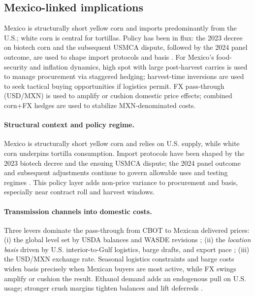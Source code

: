 \documentclass[10pt,a4paper]{article} %
\begin{document}
\subsection{Mexico-linked implications}
Mexico is structurally short yellow corn and imports predominantly from the U.S.; white corn is central for tortillas. Policy has been in flux: the 2023 decree on biotech corn and the subsequent USMCA dispute, followed by the 2024 panel outcome, are used to shape import protocols and basis \citep{fas_mexico_decree_2023,ustr_usmca_biotech_2023,ustr_usmca_biotech_win_2024,reuters_mexico_gm_ban_2025,fas_mexico_grain_annual_2025}. For Mexico’s food-security and inflation dynamics, high spot with large post-harvest carries is used to manage procurement via staggered hedging; harvest-time inversions are used to seek tactical buying opportunities if logistics permit. FX pass-through (USD/MXN) is used to amplify or cushion domestic price effects; combined corn+FX hedges are used to stabilize MXN-denominated costs.

\paragraph{Structural context and policy regime.}
Mexico is structurally short yellow corn and relies on U.S. supply, while white corn underpins tortilla consumption. Import protocols have been shaped by the 2023 biotech decree and the ensuing USMCA dispute; the 2024 panel outcome and subsequent adjustments continue to govern allowable uses and testing regimes \citep{fas_mexico_decree_2023,ustr_usmca_biotech_2023,ustr_usmca_biotech_win_2024,reuters_mexico_gm_ban_2025,fas_mexico_grain_annual_2025}. This policy layer adds non-price variance to procurement and basis, especially near contract roll and harvest windows.

\paragraph{Transmission channels into domestic costs.}
Three levers dominate the pass-through from CBOT to Mexican delivered prices:
(i) the global level set by USDA balances and WASDE revisions \citep{usda_wasde,ers_feedgrains_outlook};
(ii) the \emph{location basis} driven by U.S. interior-to-Gulf logistics, barge drafts, and export pace \citep{ams_gtr_2023};
(iii) the USD/MXN exchange rate. Seasonal logistics constraints and barge costs widen basis precisely when Mexican buyers are most active, while FX swings amplify or cushion the result. Ethanol demand adds an endogenous pull on U.S. usage; stronger crush margins tighten balances and lift deferreds \citep{ers_ethanol_40}.
\end{document}
